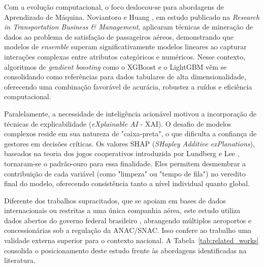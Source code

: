 \documentclass[12pt]{article}
\begin{document}
Com a evolução computacional, o foco deslocou-se para abordagens de Aprendizado de Máquina. Noviantoro e Huang \cite{noviantoro2022investigating}, em estudo publicado na \textit{Research in Transportation Business \& Management}, aplicaram técnicas de mineração de dados ao problema de satisfação de passageiros aéreos, demonstrando que modelos de \textit{ensemble} superam significativamente modelos lineares ao capturar interações complexas entre atributos categóricos e numéricos. Nesse contexto, algoritmos de \textit{gradient boosting} como o XGBoost \cite{chen2016xgboost} e o LightGBM \cite{ke2017lightgbm} vêm se consolidando como referências para dados tabulares de alta dimensionalidade, oferecendo uma combinação favorável de acurácia, robustez a ruídos e eficiência computacional.

Paralelamente, a necessidade de inteligência acionável motivou a incorporação de técnicas de explicabilidade (\textit{eXplainable AI} - XAI). O desafio de modelos complexos reside em sua natureza de "caixa-preta", o que dificulta a confiança de gestores em decisões críticas. Os valores SHAP (\textit{SHapley Additive exPlanations}), baseados na teoria dos jogos cooperativos introduzida por Lundberg e Lee \cite{lundberg2017}, tornaram-se o padrão-ouro para essa finalidade. Eles permitem desmembrar a contribuição de cada variável (como "limpeza" ou "tempo de fila") no veredito final do modelo, oferecendo consistência tanto a nível individual quanto global.

Diferente dos trabalhos supracitados, que se apoiam em bases de dados internacionais ou restritas a uma única companhia aérea, este estudo utiliza dados abertos do governo federal brasileiro \cite{snac_dados}, abrangendo múltiplos aeroportos e concessionárias sob a regulação da ANAC/SNAC. Isso confere ao trabalho uma validade externa superior para o contexto nacional. A Tabela~\ref{tab:related_works} consolida o posicionamento deste estudo frente às abordagens identificadas na literatura.

\begin{table}[ht]
\centering
\caption{Comparação com a Literatura}
\label{tab:related_works}
\end{table}
\end{document}

